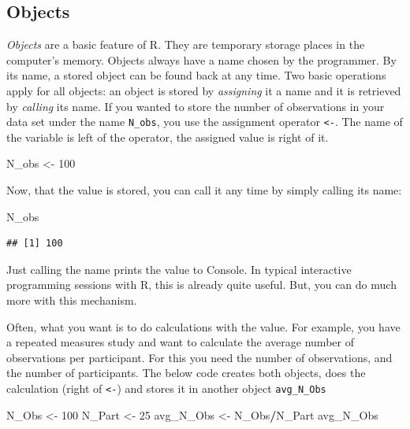 \documentclass[]{svmono}
\newenvironment{Shaded}{\begin{snugshade}}{\end{snugshade}}
\newcommand{\DecValTok}[1]{\textcolor[rgb]{0.00,0.00,0.81}{#1}}
\newcommand{\StringTok}[1]{\textcolor[rgb]{0.31,0.60,0.02}{#1}}
\newcommand{\OperatorTok}[1]{\textcolor[rgb]{0.81,0.36,0.00}{\textbf{#1}}}
\newcommand{\NormalTok}[1]{#1}
\begin{document}
\subsection{Objects}\label{objects}

\emph{Objects} are a basic feature of R. They are temporary storage
places in the computer's memory. Objects always have a name chosen by
the programmer. By its name, a stored object can be found back at any
time. Two basic operations apply for all objects: an object is stored by
\emph{assigning} it a name and it is retrieved by \emph{calling} its
name. If you wanted to store the number of observations in your data set
under the name \texttt{N\_obs}, you use the assignment operator
\texttt{\textless{}-}. The name of the variable is left of the operator,
the assigned value is right of it.

\begin{Shaded}
\begin{Highlighting}[]
\NormalTok{N_obs <-}\StringTok{ }\DecValTok{100}
\end{Highlighting}
\end{Shaded}

Now, that the value is stored, you can call it any time by simply
calling its name:

\begin{Shaded}
\begin{Highlighting}[]
\NormalTok{N_obs}
\end{Highlighting}
\end{Shaded}

\begin{verbatim}
## [1] 100
\end{verbatim}

Just calling the name prints the value to Console. In typical
interactive programming sessions with R, this is already quite useful.
But, you can do much more with this mechanism.

Often, what you want is to do calculations with the value. For example,
you have a repeated measures study and want to calculate the average
number of observations per participant. For this you need the number of
observations, and the number of participants. The below code creates
both objects, does the calculation (right of \texttt{\textless{}-}) and
stores it in another object \texttt{avg\_N\_Obs}

\begin{Shaded}
\begin{Highlighting}[]
\NormalTok{N_Obs <-}\StringTok{ }\DecValTok{100}
\NormalTok{N_Part <-}\StringTok{ }\DecValTok{25}
\NormalTok{avg_N_Obs <-}\StringTok{ }\NormalTok{N_Obs}\OperatorTok{/}\NormalTok{N_Part}
\NormalTok{avg_N_Obs}
\end{Highlighting}
\end{Shaded}
\end{document}
